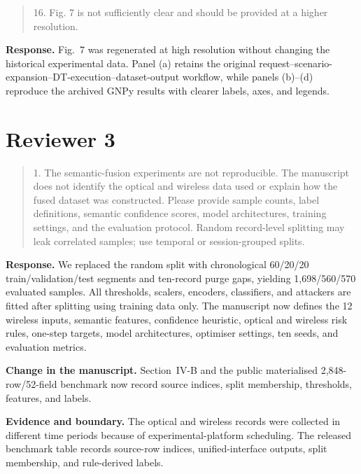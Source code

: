 \documentclass[11pt]{article}
\newenvironment{reviewercomment}{\begin{quote}\color{reviewblue}}{\end{quote}}
\newenvironment{authorresponse}{\color{responsegreen}\textbf{Response.} }{\par\color{black}}
\newcommand{\change}[1]{\par\textbf{Change in the manuscript.} #1\par}
\newcommand{\evidence}[1]{\par\textbf{Evidence and boundary.} #1\par}
\begin{document}
\begin{reviewercomment}
16. Fig. 7 is not sufficiently clear and should be provided at a higher resolution.
\end{reviewercomment}
\begin{authorresponse}
Fig.~7 was regenerated at high resolution without changing the historical experimental data. Panel (a) retains the original request--scenario-expansion--DT-execution--dataset-output workflow, while panels (b)--(d) reproduce the archived GNPy results with clearer labels, axes, and legends.
\end{authorresponse}

\section*{Reviewer 3}

\begin{reviewercomment}
1. The semantic-fusion experiments are not reproducible. The manuscript does not identify the optical and wireless data used or explain how the fused dataset was constructed. Please provide sample counts, label definitions, semantic confidence scores, model architectures, training settings, and the evaluation protocol. Random record-level splitting may leak correlated samples; use temporal or session-grouped splits.
\end{reviewercomment}
\begin{authorresponse}
We replaced the random split with chronological 60/20/20 train/validation/test segments and ten-record purge gaps, yielding 1,698/560/570 evaluated samples. All thresholds, scalers, encoders, classifiers, and attackers are fitted after splitting using training data only. The manuscript now defines the 12 wireless inputs, semantic features, confidence heuristic, optical and wireless risk rules, one-step targets, model architectures, optimiser settings, ten seeds, and evaluation metrics.
\end{authorresponse}
\change{Section~IV-B and the public materialised 2,848-row/52-field benchmark now record source indices, split membership, thresholds, features, and labels.}
\evidence{The optical and wireless records were collected in different time periods because of experimental-platform scheduling. The released benchmark table records source-row indices, unified-interface outputs, split membership, and rule-derived labels.}
\end{document}
